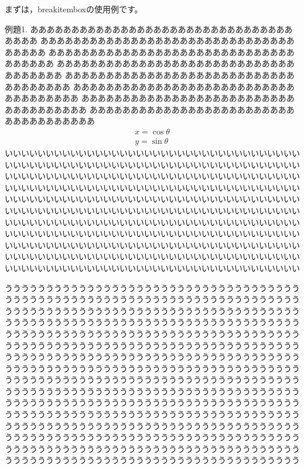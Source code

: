 \documentclass{jarticle}
\begin{document}
まずは，\textsf{breakitembox}の使用例です。
\def\breakboxparindent{1\zw}%
\begin{breakitembox}{例題1.}
ああああああああああああああああああああああああああああああああああああ
ああああああああああああああああああああああああああああああああああああ
ああああああああああああああああああああああああああああああああああああ
ああああああああああああああああああああああああああああああああああああ
ああああああああああああああああああああああああああああああああああああ
ああああああああああああああああああああああああああああああああああああ
ああああああああああああああああああああああああああああああああああああ
ああああああああああああああああああああああああああああああああああああ
\begin{align}
  x=\cos\theta\\
  y=\sin\theta
\end{align}
いいいいいいいいいいいいいいいいいいいいいいいいいいいいいいいいいいいい
いいいいいいいいいいいいいいいいいいいいいいいいいいいいいいいいいいいい
いいいいいいいいいいいいいいいいいいいいいいいいいいいいいいいいいいいい
いいいいいいいいいいいいいいいいいいいいいいいいいいいいいいいいいいいい
いいいいいいいいいいいいいいいいいいいいいいいいいいいいいいいいいいいい
いいいいいいいいいいいいいいいいいいいいいいいいいいいいいいいいいいいい
いいいいいいいいいいいいいいいいいいいいいいいいいいいいいいいいいいいい
いいいいいいいいいいいいいいいいいいいいいいいいいいいいいいいいいいいい
いいいいいいいいいいいいいいいいいいいいいいいいいいいいいいいいいいいい
いいいいいいいいいいいいいいいいいいいいいいいいいいいいいいいいいいいい
いいいいいいいいいいいいいいいいいいいいいいいいいいいいいいいいいいいい

うううううううううううううううううううううううううううううううううううう
うううううううううううううううううううううううううううううううううううう
うううううううううううううううううううううううううううううううううううう
うううううううううううううううううううううううううううううううううううう
うううううううううううううううううううううううううううううううううううう
うううううううううううううううううううううううううううううううううううう
うううううううううううううううううううううううううううううううううううう
うううううううううううううううううううううううううううううううううううう
うううううううううううううううううううううううううううううううううううう
うううううううううううううううううううううううううううううううううううう
うううううううううううううううううううううううううううううううううううう
うううううううううううううううううううううううううううううううううううう
うううううううううううううううううううううううううううううううううううう
うううううううううううううううううううううううううううううううううううう
うううううううううううううううううううううううううううううううううううう
うううううううううううううううううううううううううううううううううううう
\end{breakitembox}
\end{document}
